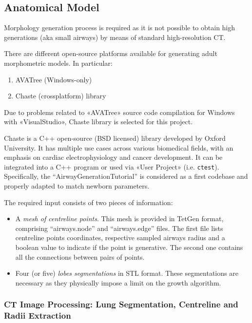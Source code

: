 \subsection{Anatomical Model}
\label{subsec:airway_development}
Morphology generation process is required as it is not possible to
obtain high generations (aka small airways) by means of standard
high-resolution CT\cite{bordas2015}.

There are different open-source platforms available for generating
adult morphometric models.  In particular:

\begin{enumerate}
\item AVATree (Windows-only)
\item Chaste (crossplatform) library
\end{enumerate}

Due to problems related to «AVATree» source code compilation for
Windows with «VisualStudio», Chaste library is selected for this
project.

Chaste is a C++ open-source (BSD licensed) library developed by Oxford
University.  It has multiple use cases across various biomedical
fields, with an emphasis on cardiac electrophysiology and cancer
development\cite{mirams2013}.  It can be integrated into a C++ program
or used via «User Project» (i.e. \texttt{ctest}).  Specifically, the
``AirwayGenerationTutorial'' is considered as a first codebase and
properly adapted to match newborn
parameters\cite{airwaygeneration2024}.

The required input consists of two pieces of information:
\begin{itemize}
\item A \emph{mesh of centreline points}.  This mesh is provided in
  TetGen format, comprising ``airways.node'' and ``airways.edge''
  files. The first file lists centreline points coordinates,
  respective sampled airways radius and a boolean value to indicate if
  the point is generative. The second one contains all the connections
  between pairs of points.
\item Four (or five) \emph{lobes segmentations} in STL format.  These
  segmentations are necessary as they physically impose a limit on the
  growth algorithm.
\end{itemize}

\subsubsection{CT Image Processing: Lung Segmentation, Centreline and
  Radii Extraction}
\label{subsubsec:ct_centreline_radii_extraction}

